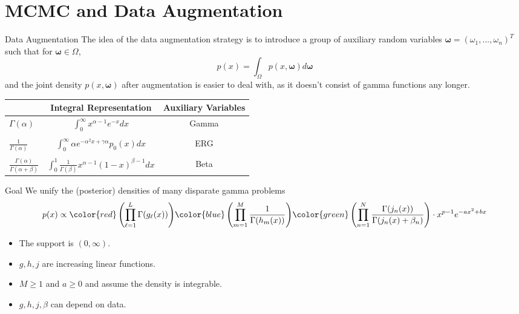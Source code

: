 \documentclass[10pt]{beamer}
\theoremstyle{remark}
\theoremstyle{definition}
\newcommand{\bcol}[1]{{\color{blue}{#1}}}
\begin{document}
\section{MCMC and Data Augmentation}

\begin{frame}{Data Augmentation}
The idea of the data augmentation strategy is to introduce a group of auxiliary random variables $\bm{\omega} = (\omega_1, ..., \omega_n)^T$ such that for $\bm{\omega} \in \Omega$,
$$
p(x) = \int_\Omega p(x,\bm{\omega}) d\bm{\omega}
$$ 
and the joint density $p(x,\bm{\omega})$ after augmentation is easier to deal with, as it doesn't consist of gamma functions any longer.
\vspace{0.1in}
\footnotesize
\begin{table}[]
\centering
\begin{tabular}{@{}lcc@{}}
	\toprule
	& Integral Representation  &  Auxiliary Variables\\ \midrule
	$\Gamma(\alpha)$ & $\int_{0}^{\infty} x^{\alpha-1} e^{-x} dx$& Gamma  \\
	& & \\
	$\frac{1}{\Gamma(\alpha)}$& $\int_{0}^\infty \alpha e^{-\alpha^2x+\gamma\alpha} p_0(x) dx$& ERG\\
	& &\\
	$\frac{\Gamma(\alpha)}{\Gamma(\alpha+\beta)}$ & $\int_{0}^1 \frac{1}{\Gamma(\beta)} x^{\alpha-1}(1-x)^{\beta-1}dx$& Beta\\
	\bottomrule
\end{tabular}
\end{table}
\end{frame}

\begin{frame}{Goal}
We unify the (posterior) densities of many disparate gamma problems
\vspace{0.05in}
{
	\footnotesize
	\begin{equation*}
	p(x)  \propto {\color{red}\left(\prod_{\ell=1}^L \Gamma(g_\ell(x)) \right)}{\color{blue} \left(\prod_{m=1}^M \frac{1}{\Gamma(h_m(x))}\right)}{\color{green} \left(\prod_{n=1}^N\frac{\Gamma(j_n(x))}{\Gamma(j_n(x) + \beta_n)}\right)} \cdot x^{p-1} e^{-ax^2 + bx}
	\end{equation*}
}
\vspace{0.05in}
\begin{itemize}
	\item The support is $(0, \infty)$.
	\item $g,h,j$ are increasing linear functions. 
	\item $M\geq 1$ and $a \geq 0$ and assume the density is integrable.
	\item $g,h,j,\beta$ can depend on data.
\end{itemize}
\vspace{0.05in}
\bcol{By exploiting the integral identities related to gamma function, we derive a general data augmentation strategy for the above density. }
\end{frame}
\end{document}
